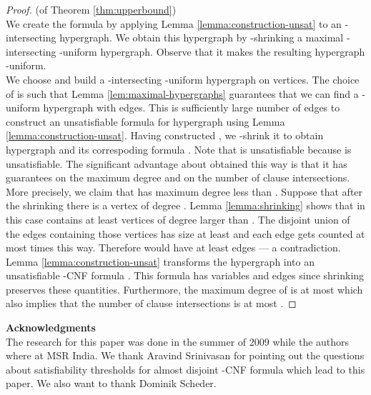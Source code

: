 \documentclass[11pt,letterpaper]{article}
\begin{document}
\begin{proof} (of Theorem \ref{thm:upperbound})\\
We create the formula by applying Lemma \ref{lemma:construction-unsat} to an -intersecting hypergraph. We obtain this hypergraph by  -shrinking a maximal -intersecting -uniform hypergraph. Observe that it makes the resulting hypergraph -uniform.\\

We choose  and build a -intersecting -uniform hypergraph on  vertices. The choice of  is such that Lemma \ref{lem:maximal-hypergraphs} guarantees that we can find a -uniform hypergraph  with  edges. This is sufficiently large number of edges to construct an unsatisfiable formula  for hypergraph  using Lemma \ref{lemma:construction-unsat}. Having constructed , we -shrink it to obtain hypergraph  and its correspoding formula .  Note that  is unsatisfiable because  is unsatisfiable.  The significant advantage about  obtained this way is that it has guarantees on the maximum degree and on the number of clause intersections. More precisely, we claim that  has maximum degree less than . Suppose that after the shrinking there is a vertex of degree . Lemma \ref{lemma:shrinking} shows that in this case  contains at least  vertices of degree larger than . The disjoint union of the edges containing those vertices has size at least  and each edge gets counted at most  times this way. Therefore  would have at least  edges --- a contradiction.\\

Lemma \ref{lemma:construction-unsat} transforms the hypergraph  into an unsatisfiable -CNF formula . This formula has  variables and  edges since shrinking preserves these quantities. Furthermore, the maximum degree  of  is at most  which also implies that the number of clause intersections is at most .
\end{proof}

\medskip

{\bfseries Acknowledgments}\\
The research for this paper was done in the summer of 2009 while the authors where at MSR India. We thank Aravind Srinivasan for pointing out the questions about satisfiability thresholds for almost disjoint -CNF formula which lead to this paper. We also want to thank Dominik Scheder. 


    
\end{document}
